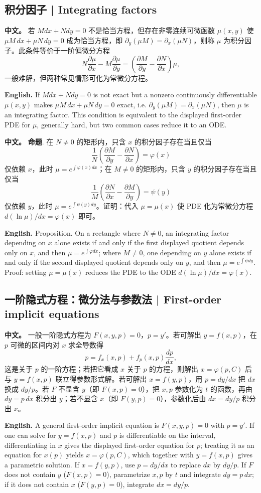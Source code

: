 \documentclass[UTF8,11pt,a4paper]{ctexart}
\newcommand{\APS}[2]{\par\noindent\textbf{中文。} #1\par\noindent\textbf{English.} #2\par}
\begin{document}
\subsection{积分因子 | Integrating factors}
\APS{若 $Mdx+Ndy=0$ 不是恰当方程，但存在非零连续可微函数 $\mu(x,y)$ 使 $\mu M\,dx+\mu N\,dy=0$ 成为恰当方程，即 $\partial_y(\mu M)=\partial_x(\mu N)$，则称 $\mu$ 为积分因子。此条件等价于一阶偏微分方程
\[
N\frac{\partial\mu}{\partial x}-M\frac{\partial\mu}{\partial y}=\left(\frac{\partial M}{\partial y}-\frac{\partial N}{\partial x}\right)\mu ,
\]
一般难解，但两种常见情形可化为常微分方程。}{If $Mdx+Ndy=0$ is not exact but a nonzero continuously differentiable $\mu(x,y)$ makes $\mu M\,dx+\mu N\,dy=0$ exact, i.e. $\partial_y(\mu M)=\partial_x(\mu N)$, then $\mu$ is an integrating factor. This condition is equivalent to the displayed first-order PDE for $\mu$, generally hard, but two common cases reduce it to an ODE.}
\APS{\textbf{命题}. 在 $N\ne0$ 的矩形内，只含 $x$ 的积分因子存在当且仅当
\[
\frac{1}{N}\left(\frac{\partial M}{\partial y}-\frac{\partial N}{\partial x}\right)=\varphi(x)
\]
仅依赖 $x$，此时 $\mu=e^{\int\varphi(x)dx}$；在 $M\ne0$ 的矩形内，只含 $y$ 的积分因子存在当且仅当
\[
\frac{1}{M}\left(\frac{\partial N}{\partial x}-\frac{\partial M}{\partial y}\right)=\psi(y)
\]
仅依赖 $y$，此时 $\mu=e^{\int\psi(y)dy}$。证明：代入 $\mu=\mu(x)$ 使 PDE 化为常微分方程 $d(\ln\mu)/dx=\varphi(x)$ 即可。}{Proposition. On a rectangle where $N\ne0$, an integrating factor depending on $x$ alone exists if and only if the first displayed quotient depends only on $x$, and then $\mu=e^{\int\varphi dx}$; where $M\ne0$, one depending on $y$ alone exists if and only if the second displayed quotient depends only on $y$, and then $\mu=e^{\int\psi dy}$. Proof: setting $\mu=\mu(x)$ reduces the PDE to the ODE $d(\ln\mu)/dx=\varphi(x)$.}
\subsection{一阶隐式方程：微分法与参数法 | First-order implicit equations}
\APS{一般一阶隐式方程为 $F(x,y,p)=0$，$p=y'$。若可解出 $y=f(x,p)$，在 $p$ 可微的区间内对 $x$ 求全导数得
\[
p=f_x(x,p)+f_p(x,p)\frac{dp}{dx},
\]
这是关于 $p$ 的一阶方程；若把它看成 $x$ 关于 $p$ 的方程，则解出 $x=\varphi(p,C)$ 后与 $y=f(x,p)$ 联立得参数形式解。若可解出 $x=f(y,p)$，用 $p=dy/dx$ 把 $dx$ 换成 $dy/p$。若 $F$ 不显含 $y$（即 $F(x,p)=0$），把 $x,p$ 参数化为 $t$ 的函数，再由 $dy=p\,dx$ 积分出 $y$；若不显含 $x$（即 $F(y,p)=0$），参数化后由 $dx=dy/p$ 积分出 $x$。}{A general first-order implicit equation is $F(x,y,p)=0$ with $p=y'$. If one can solve for $y=f(x,p)$ and $p$ is differentiable on the interval, differentiating in $x$ gives the displayed first-order equation for $p$; treating it as an equation for $x(p)$ yields $x=\varphi(p,C)$, which together with $y=f(x,p)$ gives a parametric solution. If $x=f(y,p)$, use $p=dy/dx$ to replace $dx$ by $dy/p$. If $F$ does not contain $y$ ($F(x,p)=0$), parametrize $x,p$ by $t$ and integrate $dy=p\,dx$; if it does not contain $x$ ($F(y,p)=0$), integrate $dx=dy/p$.}
\end{document}
